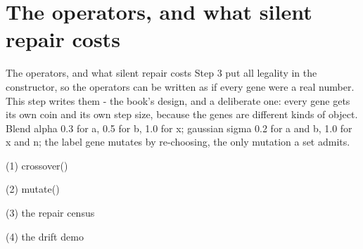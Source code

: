 
\section{The operators, and what silent repair costs}

\begin{frame}{The operators, and what silent repair costs}
Step 3 put all legality in the constructor, so the operators can be written
as if every gene were a real number. This step writes them - the book's
design, and a deliberate one: every gene gets its own coin and its own step
size, because the genes are different kinds of object. Blend alpha 0.3 for
a, 0.5 for b, 1.0 for x; gaussian sigma 0.2 for a and b, 1.0 for x and n;
the label gene mutates by re-choosing, the only mutation a set admits.
\end{frame}

\begin{frame}[fragile]{(1) crossover()}

\end{frame}

\begin{frame}[fragile]{(2) mutate()}

\end{frame}

\begin{frame}[fragile]{(3) the repair census}

\end{frame}

\begin{frame}[fragile]{(4) the drift demo}

\end{frame}


